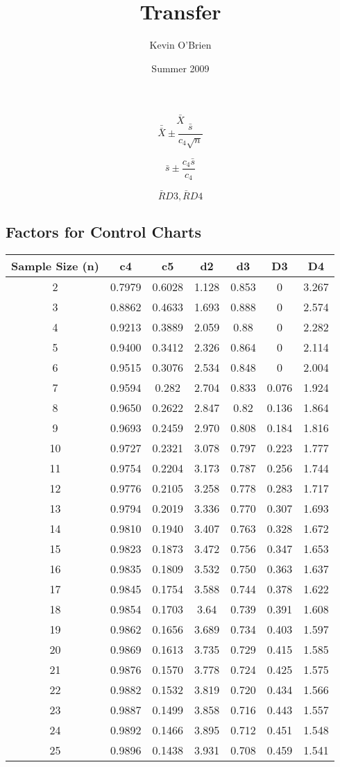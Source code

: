 \documentclass{article}
\title{Transfer}
\author{Kevin O'Brien}
\date{Summer 2009}
\begin{document}

\[ \bar{X} \]
\[\bar{\bar{X}}  \pm \frac{\bar{s}}{c_4\sqrt{n}} \]


\[ \bar{s} \pm \frac{c_4\bar{s}}{c_4}\]

\[\bar{R}D3, \bar{R}D4\]


\Large{
\subsection*{Factors for Control Charts}
\begin{tabular}{|c|c|c|c|c|c|c|}
\hline  
Sample Size (n) 	&	c4 	&	c5 	&	d2 	&	d3 	&	D3 	&	D4	\\	\hline
2	&	0.7979	&	0.6028	&	1.128	&	0.853	&	0	&	3.267	\\	
3	&	0.8862	&	0.4633	&	1.693	&	0.888	&	0	&	2.574	\\	
4	&	0.9213	&	0.3889	&	2.059	&	0.88	&	0	&	2.282	\\	
5	&	0.9400	&	0.3412	&	2.326	&	0.864	&	0	&	2.114	\\	
6	&	0.9515	&	0.3076	&	2.534	&	0.848	&	0	&	2.004	\\	
7	&	0.9594	&	0.282	&	2.704	&	0.833	&	0.076	&	1.924	\\	
8	&	0.9650	&	0.2622	&	2.847	&	0.82	&	0.136	&	1.864	\\	
9	&	0.9693	&	0.2459	&	2.970	&	0.808	&	0.184	&	1.816	\\	
10	&	0.9727	&	0.2321	&	3.078	&	0.797	&	0.223	&	1.777	\\	
11	&	0.9754	&	0.2204	&	3.173	&	0.787	&	0.256	&	1.744	\\	
12	&	0.9776	&	0.2105	&	3.258	&	0.778	&	0.283	&	1.717	\\	
13	&	0.9794	&	0.2019	&	3.336	&	0.770	&	0.307	&	1.693	\\	
14	&	0.9810	&	0.1940	&	3.407	&	0.763	&	0.328	&	1.672	\\	
15	&	0.9823	&	0.1873	&	3.472	&	0.756	&	0.347	&	1.653	\\	
16	&	0.9835	&	0.1809	&	3.532	&	0.750	&	0.363	&	1.637	\\
17	&	0.9845	&	0.1754	&	3.588	&	0.744	&	0.378	&	1.622	\\
18	&	0.9854	&	0.1703	&	3.64	&	0.739	&	0.391	&	1.608	\\
19	&	0.9862	&	0.1656	&	3.689	&	0.734	&	0.403	&	1.597	\\
20	&	0.9869	&	0.1613	&	3.735	&	0.729	&	0.415	&	1.585	\\
21	&	0.9876	&	0.1570	&	3.778	&	0.724	&	0.425	&	1.575	\\
22	&	0.9882	&	0.1532	&	3.819	&	0.720	&	0.434	&	1.566	\\
23	&	0.9887	&	0.1499	&	3.858	&	0.716	&	0.443	&	1.557	\\
24	&	0.9892	&	0.1466	&	3.895	&	0.712	&	0.451	&	1.548	\\
25	&	0.9896	&	0.1438	&	3.931	&	0.708	&	0.459	&	1.541	\\
\hline 
\end{tabular} 
} %
\end{document}
